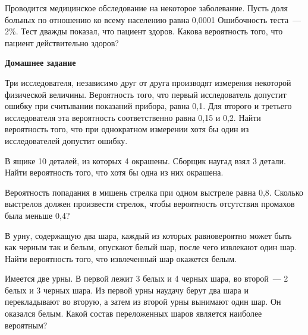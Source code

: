 \documentclass[a4paper,14pt]{extarticle}
\begin{document}
\begin{enumerate}
\item
Проводится медицинское обследование на некоторое заболевание.
Пусть доля больных по отношению ко всему населению равна 0,0001
Ошибочность теста~--- 2\%. 
Тест дважды показал, что пациент здоров. Какова вероятность того, что пациент действительно здоров?

{\item[]\centering\bfseries Домашнее задание\par}
\item
Три исследователя, независимо друг от друга производят измерения
некоторой физической величины. Вероятность того, что первый
исследователь допустит ошибку при считывании показаний прибора, равна
0,1. Для второго и третьего исследователя эта вероятность
соответственно равна 0,15 и 0,2. Найти вероятность того, что при
однократном измерении хотя бы один из исследователей допустит ошибку.
\item
В ящике 10 деталей, из которых 4 окрашены. Сборщик наугад взял 3 детали.
Найти вероятность того, что хотя бы одна из них окрашена.
\item
Вероятность попадания в мишень стрелка при одном выстреле равна 0,8.
Сколько выстрелов должен произвести стрелок, чтобы вероятность
отсутствия промахов была меньше 0,4?
\item
В урну, содержащую два шара, каждый из которых равновероятно может быть
как черным так и белым, опускают белый шар, после чего извлекают один
шар. Найти вероятность того, что извлеченный шар окажется белым.
\item
Имеется две урны. В первой лежит 3 белых и 4 черных шара, во второй~--- 2 белых и 3 черных шара. 
Из первой урны наудачу берут два шара и перекладывают во вторую, а затем из второй урны вынимают один шар. Он оказался белым. 
Какой состав переложенных шаров является наиболее вероятным?


\end{enumerate}
\end{document}
